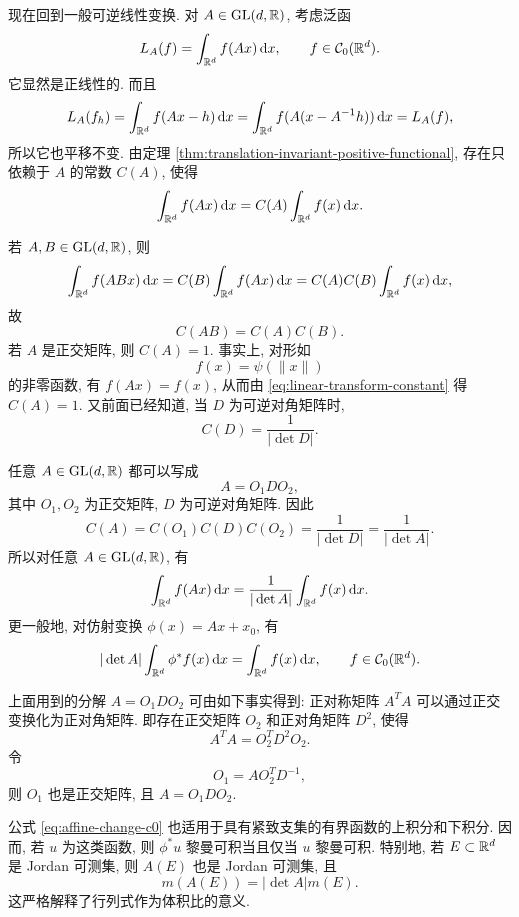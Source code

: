 现在回到一般可逆线性变换. 对 \(A\in\operatorname{GL}(d,\mathbb{R})\), 考虑泛函
\[
L_A(f)=\int_{\mathbb{R}^d}f(Ax)\,\dd x,
\qquad f\in\mathcal{C}_0(\mathbb{R}^d).
\]
它显然是正线性的. 而且
\[
L_A(f_h)=\int_{\mathbb{R}^d}f(Ax-h)\,\dd x
=\int_{\mathbb{R}^d}f(A(x-A^{-1}h))\,\dd x
=L_A(f),
\]
所以它也平移不变. 由定理 \ref{thm:translation-invariant-positive-functional}, 存在只依赖于 \(A\) 的常数 \(C(A)\), 使得
\begin{equation}
	\int_{\mathbb{R}^d}f(Ax)\,\dd x
	=C(A)\int_{\mathbb{R}^d}f(x)\,\dd x.
	\label{eq:linear-transform-constant}
\end{equation}

若 \(A,B\in\operatorname{GL}(d,\mathbb{R})\), 则
\[
\int_{\mathbb{R}^d}f(ABx)\,\dd x
=C(B)\int_{\mathbb{R}^d}f(Ax)\,\dd x
=C(A)C(B)\int_{\mathbb{R}^d}f(x)\,\dd x,
\]
故
\begin{equation}
	C(AB)=C(A)C(B).
	\label{eq:C-multiplicative}
\end{equation}
若 \(A\) 是正交矩阵, 则 \(C(A)=1\). 事实上, 对形如
\[
f(x)=\psi(\|x\|)
\]
的非零函数, 有 \(f(Ax)=f(x)\), 从而由 \eqref{eq:linear-transform-constant} 得 \(C(A)=1\). 又前面已经知道, 当 \(D\) 为可逆对角矩阵时,
\[
C(D)=\frac{1}{|\det D|}.
\]

任意 \(A\in\operatorname{GL}(d,\mathbb{R})\) 都可以写成
\[
A=O_1DO_2,
\]
其中 \(O_1,O_2\) 为正交矩阵, \(D\) 为可逆对角矩阵. 因此
\[
C(A)=C(O_1)C(D)C(O_2)=\frac{1}{|\det D|}
=\frac{1}{|\det A|}.
\]
所以对任意 \(A\in\operatorname{GL}(d,\mathbb{R})\), 有
\begin{equation}
	\int_{\mathbb{R}^d}f(Ax)\,\dd x
	=\frac{1}{|\det A|}\int_{\mathbb{R}^d}f(x)\,\dd x.
	\label{eq:linear-change-c0}
\end{equation}
更一般地, 对仿射变换 \(\phi(x)=Ax+x_0\), 有
\begin{equation}
	|\det A|\int_{\mathbb{R}^d}\phi^*f(x)\,\dd x
	=
	\int_{\mathbb{R}^d}f(x)\,\dd x,
	\qquad f\in\mathcal{C}_0(\mathbb{R}^d).
	\label{eq:affine-change-c0}
\end{equation}

\begin{rem}
	上面用到的分解 \(A=O_1DO_2\) 可由如下事实得到: 正对称矩阵 \(A^TA\) 可以通过正交变换化为正对角矩阵. 即存在正交矩阵 \(O_2\) 和正对角矩阵 \(D^2\), 使得
	\[
	A^TA=O_2^TD^2O_2.
	\]
	令
	\[
	O_1=AO_2^TD^{-1},
	\]
	则 \(O_1\) 也是正交矩阵, 且 \(A=O_1DO_2\).
\end{rem}

公式 \eqref{eq:affine-change-c0} 也适用于具有紧致支集的有界函数的上积分和下积分. 因而, 若 \(u\) 为这类函数, 则 \(\phi^*u\) 黎曼可积当且仅当 \(u\) 黎曼可积. 特别地, 若 \(E\subset\mathbb{R}^d\) 是 Jordan 可测集, 则 \(A(E)\) 也是 Jordan 可测集, 且
\begin{equation}
	m(A(E))=|\det A|m(E).
	\label{eq:det-volume-ratio}
\end{equation}
这严格解释了行列式作为体积比的意义.

